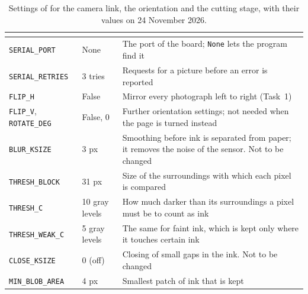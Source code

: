 \begin{table}[H]
\centering
\begin{tabular}{L{3.3cm}C{2.1cm}L{5.7cm}}
\toprule
{} &  &  \\
\midrule
\texttt{SERIAL\_PORT} & None & The port of the board; \texttt{None} lets the program find it \\
\texttt{SERIAL\_RETRIES} & 3 tries & Requests for a picture before an error is reported \\
\texttt{FLIP\_H} & False & Mirror every photograph left to right (Task~1) \\
\texttt{FLIP\_V}, \texttt{ROTATE\_DEG} & False, 0 & Further orientation settings; not needed
  when the page is turned instead \\
\midrule
\texttt{BLUR\_KSIZE} & 3 px & Smoothing before ink is separated from paper; it removes the
  noise of the sensor. Not to be changed \\
\texttt{THRESH\_BLOCK} & 31 px & Size of the surroundings with which each pixel is compared \\
\texttt{THRESH\_C} & 10 gray levels & How much darker than its surroundings a pixel must be to
  count as ink \\
\texttt{THRESH\_WEAK\_C} & 5 gray levels & The same for faint ink, which is kept only where it
  touches certain ink \\
\texttt{CLOSE\_KSIZE} & 0 (off) & Closing of small gaps in the ink. Not to be changed \\
\texttt{MIN\_BLOB\_AREA} & 4 px & Smallest patch of ink that is kept \\
\bottomrule
\end{tabular}
\caption{Settings of  for the camera link, the orientation and the cutting
stage, with their values on 24 November 2026.}
\label{tab:config}
\end{table}

